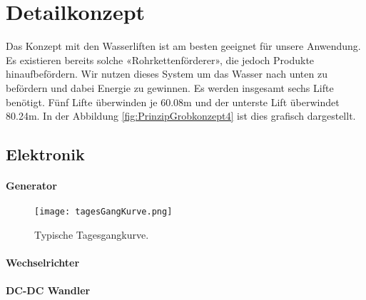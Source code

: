 \section{Detailkonzept} \label{sec:detailkonzept}

Das Konzept mit den Wasserliften ist am besten geeignet für unsere Anwendung. Es existieren bereits solche «Rohrkettenförderer», die jedoch Produkte hinaufbefördern. Wir nutzen dieses System um das Wasser nach unten zu befördern und dabei Energie zu gewinnen. Es werden insgesamt sechs Lifte benötigt. Fünf Lifte überwinden je 60.08\si{m} und der unterste Lift überwindet 80.24\si{m}. In der Abbildung \ref{fig:PrinzipGrobkonzept4}  ist dies grafisch dargestellt.

\subsection{Elektronik}


\paragraph{Generator}


\begin{figure}[H]
\centering
\texttt{[image: tagesGangKurve.png]}
\caption{Typische Tagesgangkurve. \cite{peakWaterDemand}}
\label{fig:tagesGangKurve}
\end{figure}


\paragraph{Wechselrichter}


\paragraph{DC-DC Wandler}


